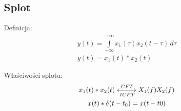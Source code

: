         

    \subsection{Splot}
        Definicja:
        \begin{gather*}
            y(t) = \int \limits _{-\infty}^{+\infty}x_1(\tau) x_2(t-\tau) \,d\tau\\
            y(t) = x_1(t)*x_2(t) 
        \end{gather*}

        \noindent
        Właściwości splotu:
        \begin{gather*}
            x_1(t)*x_2(t)\xleftrightarrow[ICFT]{CFT} X_1(f)X_2(f)\\
            x(t)*\delta(t-t_0) = x(t-t0)
        \end{gather*}